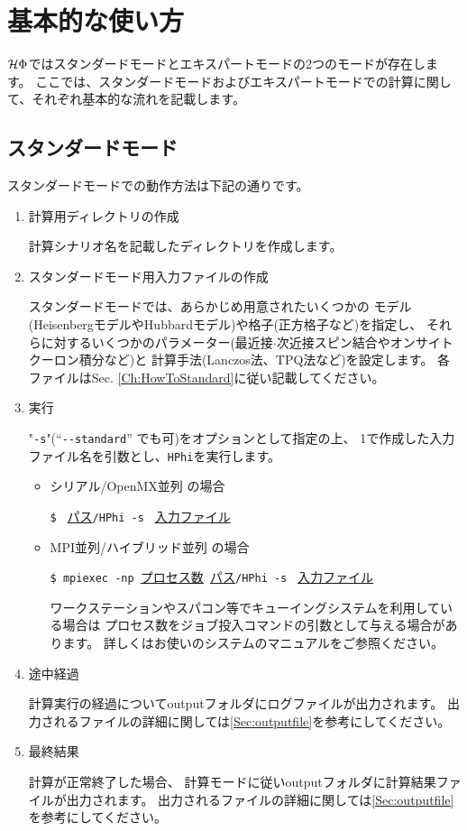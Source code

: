 \newpage
\section{基本的な使い方}
$\mathcal{H} \Phi$ではスタンダードモードとエキスパートモードの2つのモードが存在します。
ここでは、スタンダードモードおよびエキスパートモードでの計算に関して、それぞれ基本的な流れを記載します。

\subsection{スタンダードモード}
スタンダードモードでの動作方法は下記の通りです。

 \begin{enumerate}
   \item  計算用ディレクトリの作成

計算シナリオ名を記載したディレクトリを作成します。

   \item  スタンダードモード用入力ファイルの作成

スタンダードモードでは、あらかじめ用意されたいくつかの
モデル(HeisenbergモデルやHubbardモデル)や格子(正方格子など)を指定し、
それらに対するいくつかのパラメーター(最近接$\cdot$次近接スピン結合やオンサイトクーロン積分など)と
計算手法(Lanczos法、TPQ法など)を設定します。
各ファイルはSec. \ref{Ch:HowToStandard}に従い記載してください。

 \item  実行

"\verb|-s|"(``\verb|--standard|'' でも可)をオプションとして指定の上、
1で作成した入力ファイル名を引数とし、\verb|HPhi|を実行します。

\begin{itemize}
\item シリアル/OpenMX並列 の場合

  \verb|$ | \underline{パス}\verb|/HPhi -s | \underline{入力ファイル} 

\item MPI並列/ハイブリッド並列 の場合

  \verb|$ mpiexec -np |\underline{プロセス数}\verb| |\underline{パス}\verb|/HPhi -s | \underline{入力ファイル} 

  ワークステーションやスパコン等でキューイングシステムを利用している場合は
  プロセス数をジョブ投入コマンドの引数として与える場合があります。
  詳しくはお使いのシステムのマニュアルをご参照ください。

\end{itemize}

\item 途中経過

計算実行の経過についてoutputフォルダにログファイルが出力されます。
出力されるファイルの詳細に関しては\ref{Sec:outputfile}を参考にしてください。

\item 最終結果

計算が正常終了した場合、
計算モードに従いoutputフォルダに計算結果ファイルが出力されます。
出力されるファイルの詳細に関しては\ref{Sec:outputfile}を参考にしてください。
\end{enumerate}

